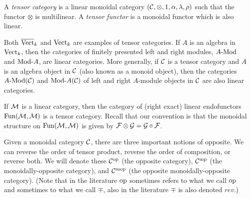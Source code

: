 \documentclass{amsart}
\begin{document}
\begin{definition}
	A {\em tensor category} is a linear monoidal category $(\mathcal C, \otimes, 1, \alpha, \lambda, \rho)$ such that the functor $\otimes$ is multilinear. A {\em tensor functor} is a monoidal functor which is also linear. 
\end{definition}

\begin{example}
	Both $\overline{\mathrm{Vect}}_k$ and $\mathrm{Vect}_k$ are examples of tensor categories. If $A$ is an algebra in $\mathrm{Vect}_k$, then the categories of finitely presented left and right modules, $\Mod{A}{}$ and $\Mod{}{A}$, are linear categories. More generally, if $\mathcal C$ is a tensor category and $A$ is an algebra object in $\mathcal C$ (also known as a monoid object), then the categories $\Mod{A}{}(\cC)$ and $\Mod{}{A}(\cC)$ of left and right $A$-module objects in $\mathcal C$ are also linear categories.
\end{example}

\begin{example}
	If $\mathcal M$ is a linear category, then the category of (right exact) linear endofunctors $\operatorname{Fun}(\mathcal M, \mathcal M)$ is a tensor category.  Recall that our convention is that the monoidal structure on $\operatorname{Fun}(\mathcal M, \mathcal M)$ is given by $\mathcal F \otimes \mathcal G = \mathcal G \circ \mathcal F$.
\end{example}

Given a monoidal category $\mathcal C$, there are three important notions of opposite. We can reverse the order of tensor product, reverse the order of composition, or reverse both.  We will denote these $\mathcal C^{\mathrm{op}}$ (the opposite category), $\mathcal C^{\mathrm{mp}}$ (the monoidally-opposite category), and $\mathcal C^{\mathrm{mop}}$ (the opposite monoidally-opposite category).  (Note that in the literature $\mathrm{op}$ sometimes refers to what we call $\mathrm{op}$ and sometimes to what we call $\mp$, also in the literature $\mp$ is also denoted $rev$.)
\end{document}
